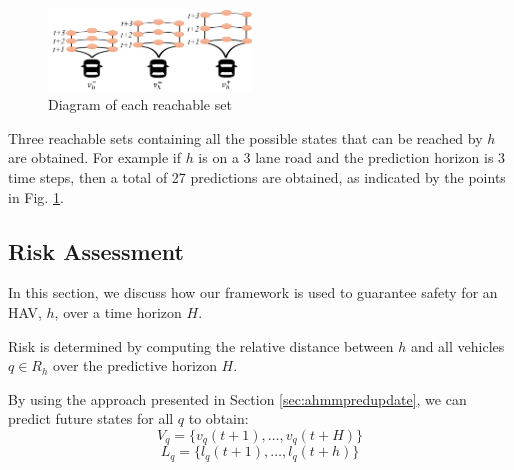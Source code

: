 \documentclass[letterpaper, 10 pt, conference]{ieeeconf}  %
\newcommand\NB[1]{$\spadesuit$\footnote{NB: #1}}
\newcommand\RP[1]{$\clubsuit$\footnote{RP: #1}}
\begin{document}
\begin{figure}[ht!]
    \includegraphics[width=0.48\textwidth]{fig/reach.png}
    \caption{Diagram of each reachable set}
    \label{fig:reach}
\end{figure}
Three reachable sets containing all the possible states that can be reached by $h$ are obtained. For example if $h$ is on a 3 lane road and the prediction horizon is 3 time steps, then a total of 27 predictions are obtained, as indicated by the points in Fig. \ref{fig:reach}.

\subsection{Risk Assessment}

 In this section, we discuss how our framework is used to guarantee safety for an HAV, $h$, over a time horizon $H$.
 
 
 Risk is determined by computing the relative distance between $h$ and all vehicles $q\in R_h$ over the predictive horizon $H$.


By using the approach presented in Section \ref{sec:ahmmpredupdate}, we can predict future states for all $q$ to obtain:
\begin{equation}
    V_q = \{v_q(t+1),\ldots,v_q(t+H)\}
\end{equation}
\begin{equation}
    L_q = \{l_q(t+1),\ldots,l_q(t+h)\}
\end{equation}
\end{document}
